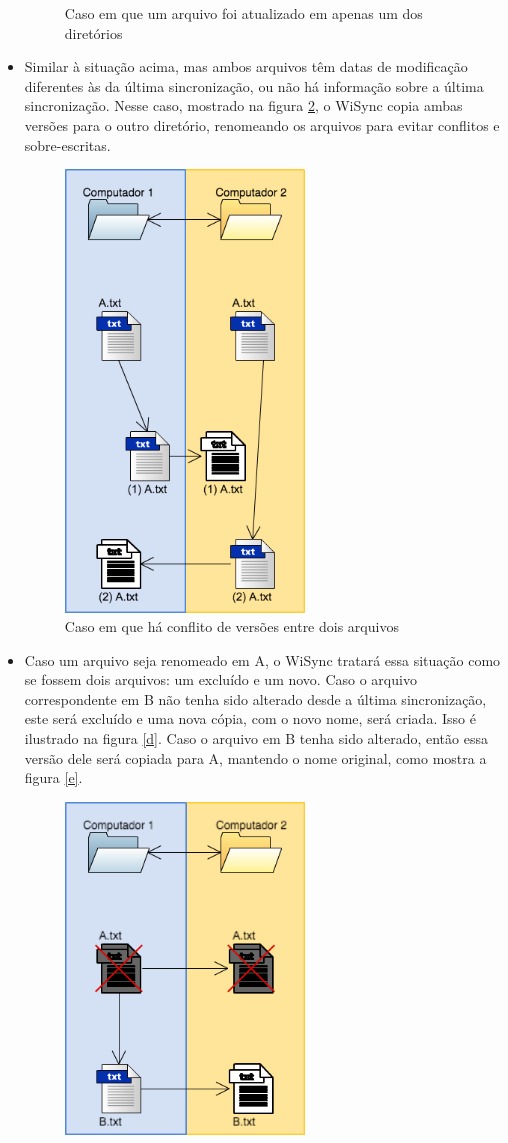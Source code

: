 \documentclass[12pt,a4paper]{ufpr}
\begin{document}
\begin{itemize}
\begin{figure}[h]
    \caption{Caso em que um arquivo foi atualizado em apenas um dos diretórios}
    \label{b}
  \end{figure}
  \item Similar à situação acima, mas ambos arquivos têm datas de modificação diferentes às da última sincronização, ou não há informação sobre a última sincronização. Nesse caso, mostrado na figura \ref{c}, o WiSync copia ambas versões para o outro diretório, renomeando os arquivos para evitar conflitos e sobre-escritas.
  \begin{figure}[h]
    \centering
    \includegraphics[width=180pt]{img/c.png}
    \caption{Caso em que há conflito de versões entre dois arquivos}
    \label{c}
  \end{figure}
  \item Caso um arquivo seja renomeado em A, o WiSync tratará essa situação como se fossem dois arquivos: um excluído e um novo. Caso o arquivo correspondente em B não tenha sido alterado desde a última sincronização, este será excluído e uma nova cópia, com o novo nome, será criada. Isso é ilustrado na figura \ref{d}. Caso o arquivo em B tenha sido alterado, então essa versão dele será copiada para A, mantendo o nome original, como mostra a figura \ref{e}.
  \begin{figure}[h]
    \centering
    \includegraphics[width=180pt]{img/d.png}

\end{figure}
\end{itemize}
\end{document}
